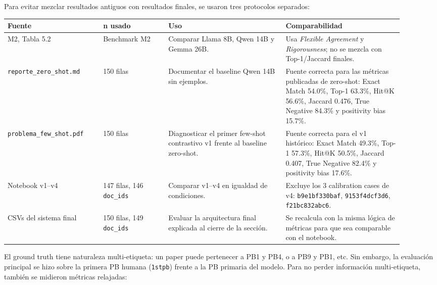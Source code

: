 Para evitar mezclar resultados antiguos con resultados finales, se usaron tres protocolos separados:

\begin{center}
\footnotesize
\setlength{\tabcolsep}{5pt}
\renewcommand{\arraystretch}{1.25}
\begin{tabular}{p{0.22\linewidth}p{0.15\linewidth}p{0.27\linewidth}p{0.27\linewidth}}
\toprule
\textbf{Fuente} & \textbf{n usado} & \textbf{Uso} & \textbf{Comparabilidad} \\
\midrule
M2, Tabla 5.2
&
Benchmark M2
&
Comparar Llama 8B, Qwen 14B y Gemma 26B.
&
Usa \emph{Flexible Agreement} y \emph{Rigorousness}; no se mezcla con Top-1/Jaccard finales.
\\[2pt]

\texttt{reporte\_zero\_shot.md}
&
150 filas
&
Documentar el baseline Qwen 14B sin ejemplos.
&
Fuente correcta para las métricas publicadas de zero-shot: Exact Match 54.0\%, Top-1 63.3\%, Hit@K 56.6\%, Jaccard 0.476, True Negative 84.3\% y positivity bias 15.7\%.
\\[2pt]

\texttt{problema\_few\_shot.pdf}
&
150 filas
&
Diagnosticar el primer few-shot contrastivo v1 frente al baseline zero-shot.
&
Fuente correcta para el v1 histórico: Exact Match 49.3\%, Top-1 57.3\%, Hit@K 50.5\%, Jaccard 0.407, True Negative 82.4\% y positivity bias 17.6\%.
\\[2pt]

Notebook v1--v4
&
147 filas, 146 \texttt{doc\_ids}
&
Comparar v1--v4 en igualdad de condiciones.
&
Excluye los 3 calibration cases de v4:
\texttt{b9e1bf330baf},
\texttt{9153f4dcf3d6},
\texttt{f21bc832abc6}.
\\[2pt]

CSVs del sistema final
&
150 filas, 149 \texttt{doc\_ids}
&
Evaluar la arquitectura final explicada al cierre de la sección.
&
Se recalcula con la misma lógica de métricas para que sea comparable con el notebook.
\\
\bottomrule
\end{tabular}
\end{center}

El ground truth tiene naturaleza multi-etiqueta: un paper puede pertenecer a PB1 y PB4, o a PB9 y PB1, etc. Sin embargo, la evaluación principal se hizo sobre la primera PB humana (\texttt{1stpb}) frente a la PB primaria del modelo. Para no perder información multi-etiqueta, también se midieron métricas relajadas:

